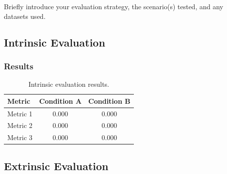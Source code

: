 \documentclass[11pt]{article}
\newif\ifguidance
\newcommand{\guidance}[1]{\ifguidance\textcolor{blue}{\small\textit{[#1]}}\fi}
\begin{document}
\begin{multicols}{2}
\guidance{%
  MARKING: This section is worth 20 marks. The marker will check:
  (1) that evaluation methods and metrics are discussed thoroughly,
  (2) that you had an appropriate evaluation plan, (3) that the method
  is clear and sensible, and (4) that results and conclusions are
  presented clearly. Use tables and figures to present results.
  Interpret your results --- do not just state numbers.}

Briefly introduce your evaluation strategy, the scenario(s) tested, and any datasets used.

\subsection{Intrinsic Evaluation}
\label{sec:intrinsic}

\guidance{%
  Describe the intrinsic evaluation: what was measured, what data was
  used (e.g.\ dataset, number of test items), and what metrics were
  applied. Define each metric with a formula if appropriate.}


\subsubsection{Results}

\guidance{%
  Present intrinsic results clearly in a table. Interpret them ---
  what do they tell you about your system's performance? Compare with
  baselines or prior work where possible.}

\begin{table}[H]
\centering
\small
\begin{tabular}{lcc}
\toprule
\textbf{Metric} & \textbf{Condition A} & \textbf{Condition B} \\
\midrule
Metric 1  & 0.000 & 0.000 \\
Metric 2  & 0.000 & 0.000 \\
Metric 3  & 0.000 & 0.000 \\
\bottomrule
\end{tabular}
\caption{Intrinsic evaluation results.}
\label{tab:intrinsic_results}
\end{table}



\subsection{Extrinsic Evaluation}
\label{sec:extrinsic}


\end{multicols}
\end{document}
